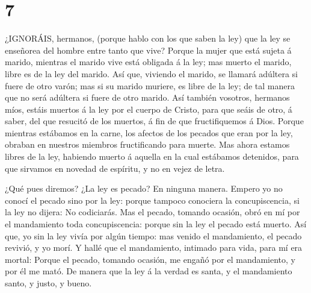 \hypertarget{section-6}{%
\section{7}\label{section-6}}

 ¿IGNORÁIS, hermanos, (porque hablo con los que saben la
ley) que la ley se enseñorea del hombre entre tanto que vive?
 Porque la mujer que está sujeta á marido, mientras el
marido vive está obligada á la ley; mas muerto el marido, libre es de la
ley del marido.  Así que, viviendo el marido, se llamará
adúltera si fuere de otro varón; mas si su marido muriere, es libre de
la ley; de tal manera que no será adúltera si fuere de otro marido.
 Así también vosotros, hermanos míos, estáis muertos á la
ley por el cuerpo de Cristo, para que seáis de otro, á saber, del que
resucitó de los muertos, á fin de que fructifiquemos á Dios.
 Porque mientras estábamos en la carne, los afectos de los
pecados que eran por la ley, obraban en nuestros miembros fructificando
para muerte.  Mas ahora estamos libres de la ley, habiendo
muerto á aquella en la cual estábamos detenidos, para que sirvamos en
novedad de espíritu, y no en vejez de letra.

 ¿Qué pues diremos? ¿La ley es pecado? En ninguna manera.
Empero yo no conocí el pecado sino por la ley: porque tampoco conociera
la concupiscencia, si la ley no dijera: No codiciarás.  Mas
el pecado, tomando ocasión, obró en mí por el mandamiento toda
concupiscencia: porque sin la ley el pecado está muerto. 
Así que, yo sin la ley vivía por algún tiempo: mas venido el
mandamiento, el pecado revivió, y yo morí.  Y hallé que el
mandamiento, intimado para vida, para mí era mortal: 
Porque el pecado, tomando ocasión, me engañó por el mandamiento, y por
él me mató.  De manera que la ley á la verdad es santa, y
el mandamiento santo, y justo, y bueno.


